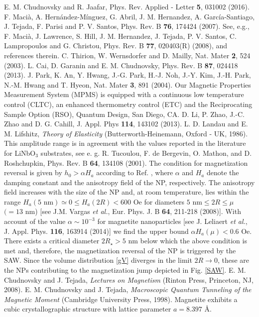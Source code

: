 \documentclass[aps,prb,floats,twocolumn]{revtex4}
\begin{document}
\begin{thebibliography}{10}
E. M. Chudnovsky and R. Jaafar, Phys. Rev. Applied - Letter {\bf 5}, 031002 (2016). 
F. Maci\`{a}, A. Hern\'{a}ndez-M\'{i}nguez, G. Abril, J. M. Hernandez, A. Garc\'{i}a-Santiago, J. Tejada, F. Parisi and  P. V. Santos, Phys. Rev. B {\bf 76}, 174424 (2007).
See, e.g., F. Maci\`{a}, J. Lawrence, S. Hill, J. M. Hernandez, J. Tejada, P. V. Santos, C. Lampropoulos and G. Christou, Phys. Rev. B {\bf 77}, 020403(R) (2008), and references therein.
C. Thirion, W. Wernsdorfer and D. Mailly, Nat. Mater {\bf 2}, 524 (2003).
L. Cai, D. Garanin and E. M. Chudnovsky, Phys. Rev. B {\bf 87}, 024418 (2013).
J. Park, K. An, Y. Hwang, J.-G. Park, H.-J. Noh, J.-Y. Kim, J.-H. Park, N.-M. Hwang and T. Hyeon, Nat. Mater {\bf 3}, 891 (2004).
Our Magnetic Properties Measurement System (MPMS) is equipped with a continuous low temperature control (CLTC), an enhanced thermometry control (ETC) and the Reciprocating Sample Option (RSO), Quantum Design, San Diego, CA.
D. Li, P. Zhao, J.-C. Zhao and D. G. Cahill, J. Appl. Phys {\bf 114}, 143102 (2013).
L. D. Landau and E. M. Lifshitz, {\it Theory of Elasticity} (Butterworth-Heinemann, Oxford - UK, 1986).
This amplitude range is in agreement with the values reported in the literature for LiNbO$_{3}$ substrates, see e. g. R. Tucoulou, F. de Bergevin, O. Mathon, and D. Roshchupkin, Phys. Rev. B {\bf 64}, 134108 (2001).
The condition for magnetization reversal is given by $h_{0}>\alpha H_{a}$ according to Ref. , where $\alpha$ and $H_{a}$ denote the damping constant and the anisotropy field of the NP, respectively. The anisotropy field increases with the size of the NP and, at room temperature, lies within the range $H_{a}(5\textrm{ nm})\simeq0\leq H_{a}(2R)<600$ Oe for diameters $5\textrm{ nm}\leq2R\leq\mu$ $(=13$ nm) [see J.M. Vargas {\it et al.}, Eur. Phys. J. B {\bf 64}, 211-218 (2008)]. With account of the value $\alpha\sim 10^{-3}$ for magnetite nanoparticles [see J. Leliaert {\it et al.}, J. Appl. Phys. {\bf 116}, 163914 (2014)] we find the upper bound $\alpha H_{a}(\mu)<0.6$ Oe. There exists a critical diameter $2R_{\star}>5$ nm below which the above condition is met and, therefore, the magnetization reversal of the NP is triggered by the SAW. Since the volume distribution \eqref{gV} diverges in the limit $2R\rightarrow0$, these are the NPs contributing to the magnetization jump depicted in Fig. \ref{SAW}.
E. M. Chudnovsky and J. Tejada, {\it Lectures on Magnetism} (Rinton Press, Princeton, NJ, 2008).
E. M. Chudnovsky and J. Tejada, {\it Macroscopic Quantum Tunneling of the Magnetic Moment} (Cambridge University Press, 1998).
Magnetite exhibits a cubic crystallographic structure with lattice parameter $a=8.397$ \AA.
\end{thebibliography}
\end{document}
